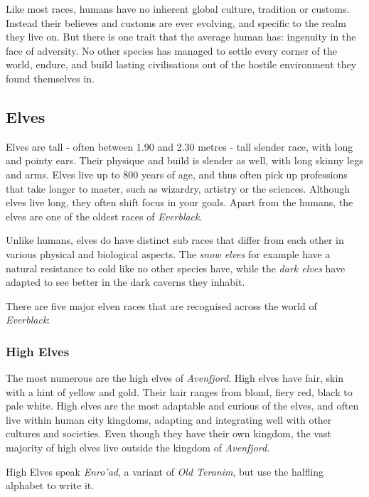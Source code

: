 Like most races, humans have no inherent global culture, tradition or customs.
Instead their believes and customs are ever evolving, and specific to the
realm they live on. But there is one trait that the average human has: ingenuity
in the face of adversity. No other species has managed to settle every corner
of the world, endure, and build lasting civilisations out of the hostile
environment they found themselves in.

\subsection*{Elves}

Elves are tall - often between 1.90 and 2.30 metres - tall slender
race, with long and pointy ears. Their physique and build is slender
as well, with long skinny legs and arms. Elves live up to 800 years of
age, and thus often pick up professions that take longer to master, such
as wizardry, artistry or the sciences. Although elves live long, they
often shift focus in your goals. Apart from the humans, the elves are one
of the oldest races of \emph{Everblack}.

Unlike humans, elves do have distinct sub races that differ from each other
in various physical and biological aspects. The \emph{snow elves} for example
have a natural resistance to cold like no other species have, while the
\emph{dark elves} have adapted to see better in the dark caverns they
inhabit.

There are five major elven races that are recognised across the world of
\emph{Everblack}:

\subsubsection*{High Elves}

The most numerous are the high elves of \emph{Avenfjord}.  High elves have
fair, skin with a hint of yellow and gold. Their hair ranges from blond, fiery
red, black to pale white. High elves are the most adaptable and curious of the
elves, and often live within human city kingdoms, adapting and integrating
well with other cultures and societies. Even though they have their own
kingdom, the vast majority of high elves live outside the kingdom
of \emph{Avenfjord}.

High Elves speak \emph{Enro'ad}, a variant of \emph{Old Teranim}, but use the
halfling alphabet to write it.

